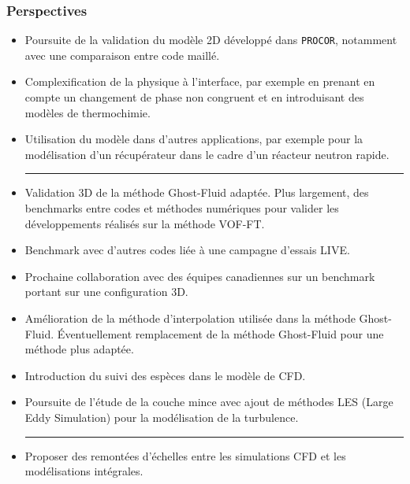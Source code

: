 \documentclass{beamer}
\newcommand{\procor}{\texttt{PROCOR}}
\begin{document}
\begin{frame}
    \frametitle{Perspectives}
    \scriptsize
    
         \begin{itemize}
        	\item  Poursuite de la validation du modèle 2D développé dans \procor, notamment avec une comparaison entre code maillé.
        	\item  Complexification de la physique à l'interface, par exemple en prenant en compte un changement de phase non congruent et en introduisant des modèles de thermochimie.
        	 \item  Utilisation du modèle dans d'autres applications, par exemple pour la modélisation d'un récupérateur dans le cadre d'un réacteur neutron rapide.
        	 
        	  {\center \rule{0.8\linewidth}{1pt}}
        	  	
        	\item  Validation 3D de la méthode Ghost-Fluid adaptée. Plus largement, des benchmarks entre codes et méthodes numériques pour valider les développements réalisés sur la méthode VOF-FT. 
        	\item Benchmark avec d'autres codes liée à une campagne d'essais LIVE.
        	\item Prochaine collaboration avec des équipes canadiennes sur un benchmark portant sur une configuration 3D.
        	
        	
        	
            
            \item Amélioration de la méthode d'interpolation utilisée dans la méthode Ghost-Fluid. Éventuellement remplacement de la méthode Ghost-Fluid pour une méthode plus adaptée.
            \item Introduction du suivi des espèces dans le modèle de CFD.
            
           
            \item Poursuite de l'étude de la couche mince avec ajout de méthodes LES (Large Eddy Simulation) pour la modélisation de la turbulence.
            
            {\center \rule{0.8\linewidth}{1pt}}
            
            \item Proposer des remontées d'échelles entre les simulations CFD et les modélisations intégrales.
            
        \end{itemize}

\end{frame}
\end{document}
